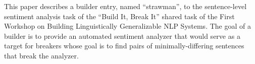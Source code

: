 This paper describes a builder entry, named ``strawman'', to the sentence-level sentiment analysis task of the ``Build It, Break It'' shared task of the First Workshop on Building Linguistically Generalizable NLP Systems. The goal of a builder is to provide an automated sentiment analyzer that would serve as a target for breakers whose goal is to find pairs of minimally-differing sentences that break the analyzer.
